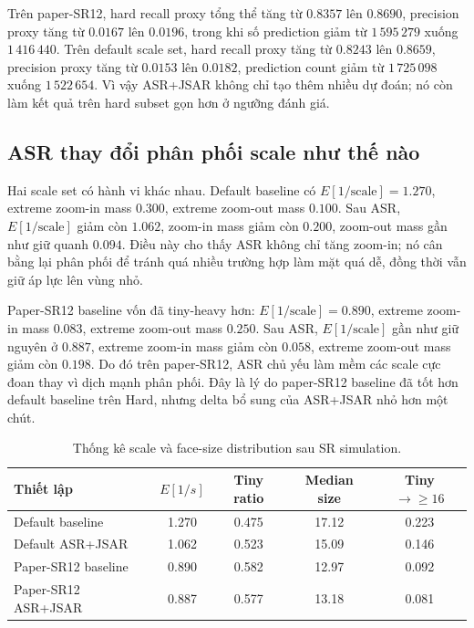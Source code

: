 Trên paper-SR12, hard recall proxy tổng thể tăng từ \(0.8357\) lên \(0.8690\), precision proxy tăng từ \(0.0167\) lên \(0.0196\), trong khi số prediction giảm từ \(1\,595\,279\) xuống \(1\,416\,440\). Trên default scale set, hard recall proxy tăng từ \(0.8243\) lên \(0.8659\), precision proxy tăng từ \(0.0153\) lên \(0.0182\), prediction count giảm từ \(1\,725\,098\) xuống \(1\,522\,654\). Vì vậy ASR+JSAR không chỉ tạo thêm nhiều dự đoán; nó còn làm kết quả trên hard subset gọn hơn ở ngưỡng đánh giá.

\subsection{ASR thay đổi phân phối scale như thế nào}

Hai scale set có hành vi khác nhau. Default baseline có \(E[1/\text{scale}]=1.270\), extreme zoom-in mass \(0.300\), extreme zoom-out mass \(0.100\). Sau ASR, \(E[1/\text{scale}]\) giảm còn \(1.062\), zoom-in mass giảm còn \(0.200\), zoom-out mass gần như giữ quanh \(0.094\). Điều này cho thấy ASR không chỉ tăng zoom-in; nó cân bằng lại phân phối để tránh quá nhiều trường hợp làm mặt quá dễ, đồng thời vẫn giữ áp lực lên vùng nhỏ.

Paper-SR12 baseline vốn đã tiny-heavy hơn: \(E[1/\text{scale}]=0.890\), extreme zoom-in mass \(0.083\), extreme zoom-out mass \(0.250\). Sau ASR, \(E[1/\text{scale}]\) gần như giữ nguyên ở \(0.887\), extreme zoom-in mass giảm còn \(0.058\), extreme zoom-out mass giảm còn \(0.198\). Do đó trên paper-SR12, ASR chủ yếu làm mềm các scale cực đoan thay vì dịch mạnh phân phối. Đây là lý do paper-SR12 baseline đã tốt hơn default baseline trên Hard, nhưng delta bổ sung của ASR+JSAR nhỏ hơn một chút.

\begin{table}[H]
\centering
\caption{Thống kê scale và face-size distribution sau SR simulation.}
\small
\begin{tabular}{@{}lcccc@{}}
\toprule
\textbf{Thiết lập} & \textbf{\(E[1/s]\)} & \textbf{Tiny ratio} & \textbf{Median size} & \textbf{Tiny \(\rightarrow\geq16\)} \\
\midrule
Default baseline & 1.270 & 0.475 & 17.12 & 0.223 \\
Default ASR+JSAR & 1.062 & 0.523 & 15.09 & 0.146 \\
Paper-SR12 baseline & 0.890 & 0.582 & 12.97 & 0.092 \\
Paper-SR12 ASR+JSAR & 0.887 & 0.577 & 13.18 & 0.081 \\
\bottomrule
\end{tabular}
\end{table}

